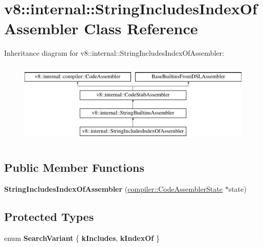 \hypertarget{classv8_1_1internal_1_1StringIncludesIndexOfAssembler}{}\section{v8\+:\+:internal\+:\+:String\+Includes\+Index\+Of\+Assembler Class Reference}
\label{classv8_1_1internal_1_1StringIncludesIndexOfAssembler}
Inheritance diagram for v8\+:\+:internal\+:\+:String\+Includes\+Index\+Of\+Assembler\+:\begin{figure}[H]
\begin{center}
\leavevmode
\includegraphics[height=4.000000cm]{classv8_1_1internal_1_1StringIncludesIndexOfAssembler}
\end{center}
\end{figure}
\subsection*{Public Member Functions}
\begin{DoxyCompactItemize}
\item 
\mbox{\label{classv8_1_1internal_1_1StringIncludesIndexOfAssembler_a6dd7ef1a6a31dcf6618fee2bf5046b97}} 
{\bfseries String\+Includes\+Index\+Of\+Assembler} (\mbox{\hyperlink{classv8_1_1internal_1_1compiler_1_1CodeAssemblerState}{compiler\+::\+Code\+Assembler\+State}} $\ast$state)
\end{DoxyCompactItemize}
\subsection*{Protected Types}
\begin{DoxyCompactItemize}
\item 
\mbox{\label{classv8_1_1internal_1_1StringIncludesIndexOfAssembler_a72f29809217c4bd09c5a131a113c1155}} 
enum {\bfseries Search\+Variant} \{ {\bfseries k\+Includes}, 
{\bfseries k\+Index\+Of}
 \}
\end{DoxyCompactItemize}
